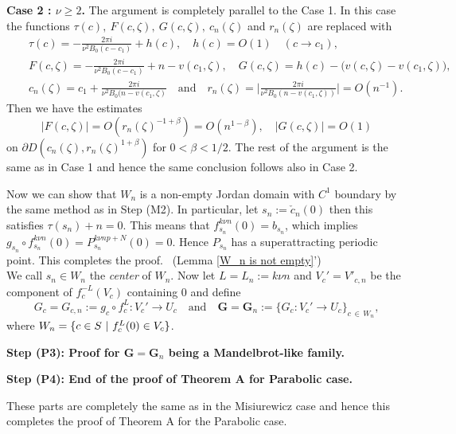 \noin
{\bf Case 2 : $\nu \geq 2$. }
The argument is completely parallel to the Case 1. In this case
the functions $\tau(c), \ F(c,\zeta), \ G(c,\zeta), \ c_n(\zeta)$ and $r_n(\zeta)$
are replaced with
\begin{eqnarray*}
& & \tau(c)
= 
-\frac{2 \pi i}{\nu^2 B_0(c-c_1)} + h(c), \quad h(c) = O(1) \quad (c \to c_1), \\
& & F(c,\zeta) 
= 
-\frac{2 \pi i}{\nu^2 B_0(c-c_1)} + n - v(c_1,\zeta), \quad
G(c,\zeta)
=  h(c) - \big( v(c,\zeta)- v(c_1,\zeta) \big), \\
& & c_n(\zeta) 
=
c_1 + \frac{2 \pi i}{\nu^2 B_0(n-v(c_1,\zeta)} \quad \text{and} \quad
r_n(\zeta) = \bigg| \frac{2\pi i}{\nu^2 B_0(n - v(c_1,\zeta))} \bigg| = O(n^{-1}).
\end{eqnarray*}
Then we have the estimates
$$
  |F(c,\zeta)| = O(r_n(\zeta)^{-1+\beta}) = O(n^{1-\beta}), \quad
  |G(c,\zeta)| = O(1)
$$
on $\partial D(c_n(\zeta), r_n(\zeta)^{1+\beta})$ for $0 < \beta < 1/2$.
The rest of the argument is the same as in Case 1 and hence 
the same conclusion follows also in Case 2. 




Now we can show that $W_n$ is a non-empty Jordan domain with $C^1$ boundary
by the same method as in Step (M2). 
In particular, let $s_n := \check{c}_n(0)$ then this satisfies
$\tau(s_n) + n = 0$. This means that
$f_{s_n}^{k\nu n}(0) = b_{s_n}$,
which implies $g_{s_n} \circ f_{s_n}^{k\nu n}(0) = P_{s_n}^{k\nu np + N}(0)= 0$. 
Hence $P_{s_n}$ has a superattracting periodic point. 
This completes the proof.
\QED ~{\small (Lemma \ref{W_n is not empty}')}
\\



We call $s_n \in W_n$ the {\it center} of $W_n$. Now let 
$L = L_n  := k\nu n$ and
$V_c'=V'_{c,n}$ be the component of $f_c^{-L}(V_c)$ containing 
$0$ and define
$$
  G_c = G_{c,n} := g_c \circ f_c^L : V_c' \to U_c
  \quad \text{and} \quad
 \boldsymbol{G} = \boldsymbol{G}_n 
 := 
\{ G_c : V_c' \to U_c \}_{c \,\in\, W_n},
$$
where $W_n=\{c \in S \ | \  f_c^L(0) \in V_c\}$.



\medskip




\noin
{\bf Step (P3): Proof for $\boldsymbol{G} = \boldsymbol{G}_n$ 
being a Mandelbrot-like family.} 

\noin
{\bf Step (P4): End of the proof of Theorem A for Parabolic case.}


These parts are completely the same as in the Misiurewicz case
and hence this completes the proof of Theorem A for the Parabolic case.
\QED
\\



